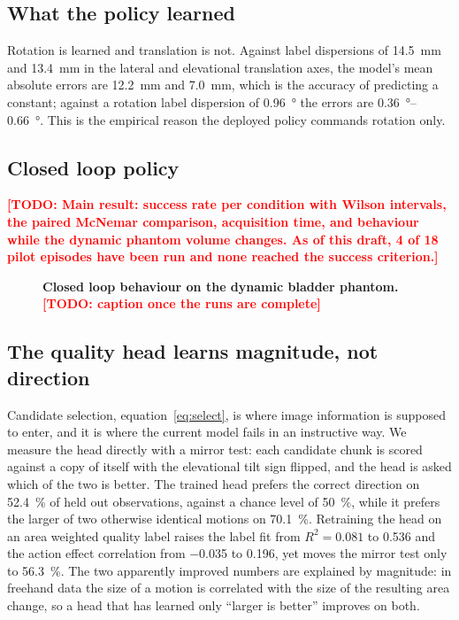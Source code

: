 \documentclass[conference]{IEEEtran}
\newcommand{\TODO}[1]{\textcolor{red}{\textbf{[TODO: #1]}}}
\newcommand{\figspace}[1]{\vspace{#1}}
\begin{document}
\subsection{What the policy learned}

Rotation is learned and translation is not. Against label dispersions of
\SI{14.5}{\milli\metre} and \SI{13.4}{\milli\metre} in the lateral and
elevational translation axes, the model's mean absolute errors are
\SI{12.2}{\milli\metre} and \SI{7.0}{\milli\metre}, which is the accuracy of
predicting a constant; against a rotation label dispersion of
\SI{0.96}{\degree} the errors are \SIrange{0.36}{0.66}{\degree}. This is the
empirical reason the deployed policy commands rotation only.

\subsection{Closed loop policy}

\TODO{Main result: success rate per condition with Wilson intervals, the paired
McNemar comparison, acquisition time, and behaviour while the dynamic phantom
volume changes. As of this draft, 4 of 18 pilot episodes have been run and none
reached the success criterion.}

\begin{figure}[t]
\centering
\figspace{38mm}
\caption{\textbf{Closed loop behaviour on the dynamic bladder phantom.}
\TODO{caption once the runs are complete}}
\label{fig:results}
\end{figure}

\subsection{The quality head learns magnitude, not direction}
\label{sec:negative}

Candidate selection, equation~\eqref{eq:select}, is where image information is
supposed to enter, and it is where the current model fails in an instructive
way. We measure the head directly with a mirror test: each candidate chunk is
scored against a copy of itself with the elevational tilt sign flipped, and the
head is asked which of the two is better. The trained head prefers the correct
direction on \SI{52.4}{\percent} of held out observations, against a chance
level of \SI{50}{\percent}, while it prefers the larger of two otherwise
identical motions on \SI{70.1}{\percent}. Retraining the head on an area
weighted quality label raises the label fit from $R^2 = \num{0.081}$ to
\num{0.536} and the action effect correlation from \num{-0.035} to
\num{+0.196}, yet moves the mirror test only to \SI{56.3}{\percent}. The two
apparently improved numbers are explained by magnitude: in freehand data the
size of a motion is correlated with the size of the resulting area change, so a
head that has learned only ``larger is better'' improves on both.
\end{document}
